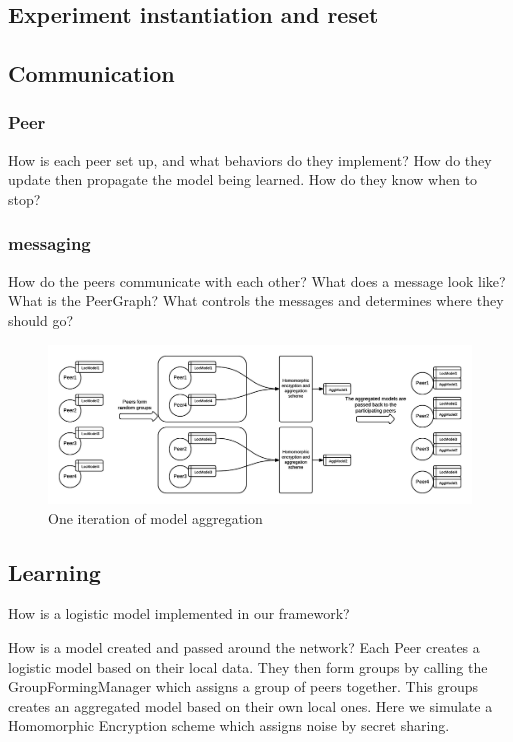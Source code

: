 \subsection{Experiment instantiation and reset}


\subsection{Communication}
\subsubsection{Peer}
How is each peer set up, and what behaviors do they implement? 
How do they update then propagate the model being learned.
How do they know when to stop?
\subsubsection{messaging}
How do the peers communicate with each other?
What does a message look like?
What is the PeerGraph?
What controls the messages and determines where they should go?
\begin{figure}[h!]
	\centering
	\includegraphics[width=\textwidth]{fig/peerModelCreation}
	\caption{One iteration of model aggregation}
	\label{fig:peerAggregationFigure}
\end{figure}


\subsection{Learning}
How is a logistic model implemented in our framework?

How is a model created and passed around the network?
Each Peer creates a logistic model based on their local data. They then form groups by calling the GroupFormingManager which assigns a group of peers together. This groups creates an aggregated model based on their own local ones. Here we simulate a Homomorphic Encryption scheme which assigns noise by secret sharing. 


